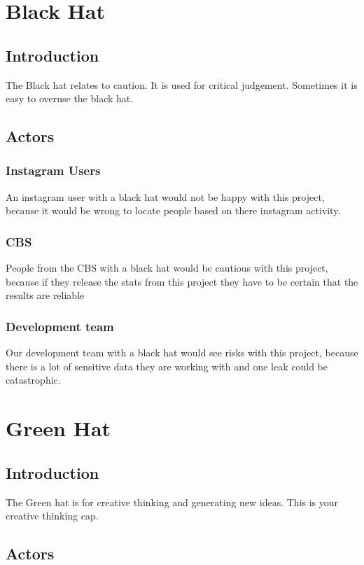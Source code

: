 \documentclass{article}
\begin{document}
\pagebreak

\section{Black Hat}
    \subsection{Introduction}
        The Black hat relates to caution. It is used for critical judgement. Sometimes it is easy to overuse the black hat.

    \subsection{Actors}
        \subsubsection{Instagram Users}
            An instagram user with a black hat would not be happy with this project, because it would be wrong to locate people based on there instagram activity.
            
        \subsubsection{CBS}
            People from the CBS with a black hat would be cautious with this project, because if they release the stats from this project they have to be certain that the results are reliable 
            
        \subsubsection{Development team}
            Our development team with a black hat would see risks with this project, because there is a lot of sensitive data they are working with and one leak could be catastrophic.
\pagebreak

\section{Green Hat}
    \subsection{Introduction}
        The Green hat is for creative thinking and generating new ideas. This is your creative thinking cap.

    \subsection{Actors}
\end{document}
